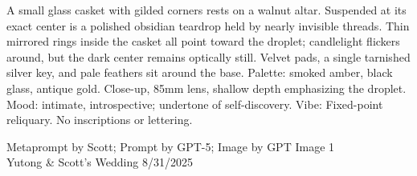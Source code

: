 \documentclass[12pt]{article}
\begin{document}
\noindent
\begin{adjustbox}{max size={\textwidth}{\textheight}}
\begin{varwidth}{\textwidth}
\RaggedRight
\footnotesize
A small glass casket with gilded corners rests on a walnut altar. Suspended at its exact center is a polished obsidian teardrop held by nearly invisible threads. Thin mirrored rings inside the casket all point toward the droplet; candlelight flickers around, but the dark center remains optically still. Velvet pads, a single tarnished silver key, and pale feathers sit around the base. Palette: smoked amber, black glass, antique gold. Close-up, 85mm lens, shallow depth emphasizing the droplet. Mood: intimate, introspective; undertone of self-discovery. Vibe: Fixed-point reliquary. No inscriptions or lettering.
\end{varwidth}
\end{adjustbox}
\vfill
{\raggedleft\footnotesize
Metaprompt by Scott; Prompt by GPT-5; Image by GPT Image 1 \\
Yutong \& Scott's Wedding 8/31/2025\par}
\end{document}
